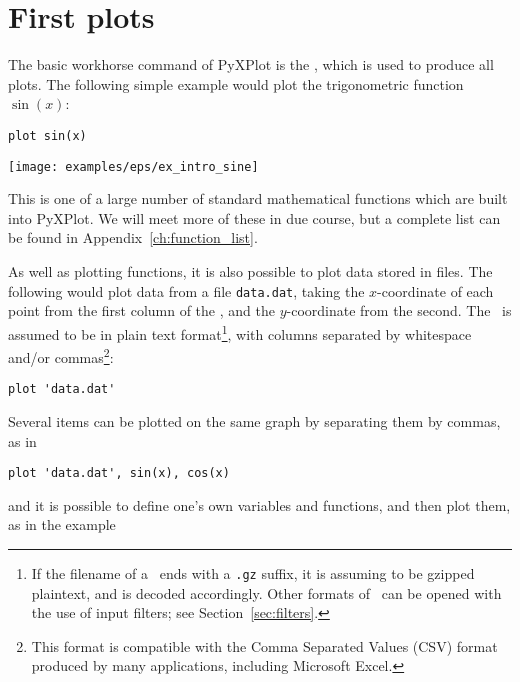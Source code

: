 \section{First plots}
\label{sec:first_plots}

The basic workhorse command of PyXPlot is the , which is used to
produce all plots. The following simple example would plot the trigonometric
function $\sin(x)$:

\begin{verbatim}
plot sin(x)
\end{verbatim}

\begin{center}
\texttt{[image: examples/eps/ex\_intro\_sine]}
\end{center}

\noindent This is one of a large number of standard mathematical functions
which are built into PyXPlot. We will meet more of these in due course, but a
complete list can be found in Appendix~\ref{ch:function_list}.

As well as plotting functions, it is also possible to plot data stored in
files. The following would plot data from a file {\tt data.dat}, taking the
$x$-coordinate of each point from the first column of the \datafile, and the
$y$-coordinate from the second.  The \datafile\ is assumed to be in plain text
format\footnote{If the filename of a \datafile\ ends with a {\tt .gz} suffix,
it is assuming to be gzipped plaintext, and is decoded accordingly. Other
formats of \datafile\ can be opened with the use of input filters; see
Section~\ref{sec:filters}.}, with columns separated by whitespace and/or
commas\footnote{This format is compatible with the Comma Separated Values (CSV)
format produced by many applications, including Microsoft Excel.}:

\begin{verbatim}
plot 'data.dat'
\end{verbatim}

Several items can be plotted on the same graph by separating them by commas, as
in

\begin{verbatim}
plot 'data.dat', sin(x), cos(x)
\end{verbatim}

\noindent and it is possible to define one's own variables and functions,
and then plot them, as in the example

